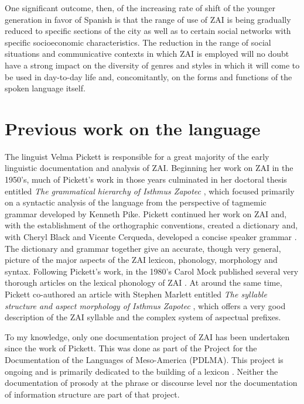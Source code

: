 One significant outcome, then, of the increasing rate of shift of the younger generation in favor of Spanish is that the range of use of ZAI is being gradually reduced to specific sections of the city as well as to certain social networks with specific socioeconomic characteristics. The reduction in the range of social situations and communicative contexts in which ZAI is employed will no doubt have a strong impact on the diversity of genres and styles in which it will come to be used in day-to-day life and, concomitantly, on the forms and functions of the spoken language itself.



\section{Previous work on the language}

The linguist Velma Pickett is responsible for a great majority of the early linguistic documentation and analysis of ZAI.  Beginning her work on ZAI in the 1950's, much of Pickett's work in those years culminated in her doctoral thesis entitled \textit{The grammatical hierarchy of Isthmus Zapotec} \citep{pickett1960}, which focused primarily on a syntactic analysis of the language from the perspective of tagmemic grammar developed by Kenneth Pike. Pickett continued her work on ZAI and, with the establishment of the orthographic conventions, created a dictionary \citep{pickett1979} and, with Cheryl Black and Vicente Cerqueda, developed a concise speaker grammar \citep{pickett1998}. The dictionary and grammar together give an accurate, though very general, picture of the major aspects of the ZAI lexicon, phonology, morphology and syntax. Following Pickett's work, in the 1980's Carol Mock published several very thorough articles on the lexical phonology of ZAI \citep{mock1983,mock1985a,mock1985b,mock1988}. At around the same time, Pickett co-authored an article with Stephen Marlett entitled \textit{The syllable structure and aspect morphology of Isthmus Zapotec} \citep{marlett1987}, which offers a very good description of the ZAI syllable and the complex system of aspectual prefixes. 

To my knowledge, only one documentation project of ZAI has been undertaken since the work of Pickett. This was done as part of the Project for the Documentation of the Languages of Meso-America (PDLMA). This project is ongoing and is primarily dedicated to the building of a lexicon \citep{perezms}. Neither the documentation of prosody at the phrase or discourse level nor the documentation of information structure are part of that project. 

